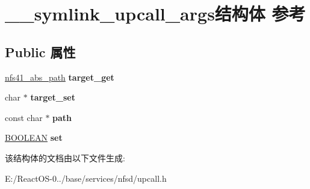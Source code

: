 \hypertarget{struct____symlink__upcall__args}{}\section{\+\_\+\+\_\+symlink\+\_\+upcall\+\_\+args结构体 参考}
\label{struct____symlink__upcall__args}
\subsection*{Public 属性}
\begin{DoxyCompactItemize}
\item 
\mbox{\label{struct____symlink__upcall__args_a3aef3a2d3c61c663f32c23dc53c34a7e}} 
\hyperlink{struct____nfs41__abs__path}{nfs41\+\_\+abs\+\_\+path} {\bfseries target\+\_\+get}
\item 
\mbox{\label{struct____symlink__upcall__args_a880f2b044d3bef0e17d4f5d4d434a146}} 
char $\ast$ {\bfseries target\+\_\+set}
\item 
\mbox{\label{struct____symlink__upcall__args_acf18f1e882a54d9c78744cbbdc3a5aee}} 
const char $\ast$ {\bfseries path}
\item 
\mbox{\label{struct____symlink__upcall__args_a7af8b5fea87c98bb0683a64e20b83bcb}} 
\hyperlink{_processor_bind_8h_a112e3146cb38b6ee95e64d85842e380a}{B\+O\+O\+L\+E\+AN} {\bfseries set}
\end{DoxyCompactItemize}


该结构体的文档由以下文件生成\+:\begin{DoxyCompactItemize}
\item 
E\+:/\+React\+O\+S-\/0../base/services/nfsd/upcall.\+h\end{DoxyCompactItemize}
